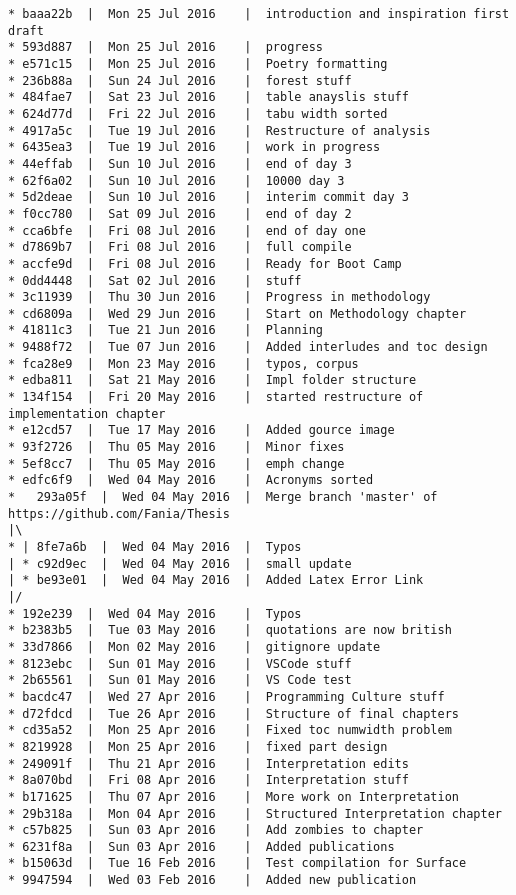 \begin{verbatim}
* baaa22b  |  Mon 25 Jul 2016	 |  introduction and inspiration first draft
* 593d887  |  Mon 25 Jul 2016	 |  progress
* e571c15  |  Mon 25 Jul 2016	 |  Poetry formatting
* 236b88a  |  Sun 24 Jul 2016	 |  forest stuff
* 484fae7  |  Sat 23 Jul 2016	 |  table anayslis stuff
* 624d77d  |  Fri 22 Jul 2016	 |  tabu width sorted
* 4917a5c  |  Tue 19 Jul 2016	 |  Restructure of analysis
* 6435ea3  |  Tue 19 Jul 2016	 |  work in progress
* 44effab  |  Sun 10 Jul 2016	 |  end of day 3
* 62f6a02  |  Sun 10 Jul 2016	 |  10000 day 3
* 5d2deae  |  Sun 10 Jul 2016	 |  interim commit day 3
* f0cc780  |  Sat 09 Jul 2016	 |  end of day 2
* cca6bfe  |  Fri 08 Jul 2016	 |  end of day one
* d7869b7  |  Fri 08 Jul 2016	 |  full compile
* accfe9d  |  Fri 08 Jul 2016	 |  Ready for Boot Camp
* 0dd4448  |  Sat 02 Jul 2016	 |  stuff
* 3c11939  |  Thu 30 Jun 2016	 |  Progress in methodology
* cd6809a  |  Wed 29 Jun 2016	 |  Start on Methodology chapter
* 41811c3  |  Tue 21 Jun 2016	 |  Planning
* 9488f72  |  Tue 07 Jun 2016	 |  Added interludes and toc design
* fca28e9  |  Mon 23 May 2016	 |  typos, corpus
* edba811  |  Sat 21 May 2016	 |  Impl folder structure
* 134f154  |  Fri 20 May 2016	 |  started restructure of implementation chapter
* e12cd57  |  Tue 17 May 2016	 |  Added gource image
* 93f2726  |  Thu 05 May 2016	 |  Minor fixes
* 5ef8cc7  |  Thu 05 May 2016	 |  emph change
* edfc6f9  |  Wed 04 May 2016	 |  Acronyms sorted
*   293a05f  |  Wed 04 May 2016	 |  Merge branch 'master' of https://github.com/Fania/Thesis
|\  
* | 8fe7a6b  |  Wed 04 May 2016	 |  Typos
| * c92d9ec  |  Wed 04 May 2016	 |  small update
| * be93e01  |  Wed 04 May 2016	 |  Added Latex Error Link
|/  
* 192e239  |  Wed 04 May 2016	 |  Typos
* b2383b5  |  Tue 03 May 2016	 |  quotations are now british
* 33d7866  |  Mon 02 May 2016	 |  gitignore update
* 8123ebc  |  Sun 01 May 2016	 |  VSCode stuff
* 2b65561  |  Sun 01 May 2016	 |  VS Code test
* bacdc47  |  Wed 27 Apr 2016	 |  Programming Culture stuff
* d72fdcd  |  Tue 26 Apr 2016	 |  Structure of final chapters
* cd35a52  |  Mon 25 Apr 2016	 |  Fixed toc numwidth problem
* 8219928  |  Mon 25 Apr 2016	 |  fixed part design
* 249091f  |  Thu 21 Apr 2016	 |  Interpretation edits
* 8a070bd  |  Fri 08 Apr 2016	 |  Interpretation stuff
* b171625  |  Thu 07 Apr 2016	 |  More work on Interpretation
* 29b318a  |  Mon 04 Apr 2016	 |  Structured Interpretation chapter
* c57b825  |  Sun 03 Apr 2016	 |  Add zombies to chapter
* 6231f8a  |  Sun 03 Apr 2016	 |  Added publications
* b15063d  |  Tue 16 Feb 2016	 |  Test compilation for Surface
* 9947594  |  Wed 03 Feb 2016	 |  Added new publication

\end{verbatim}
